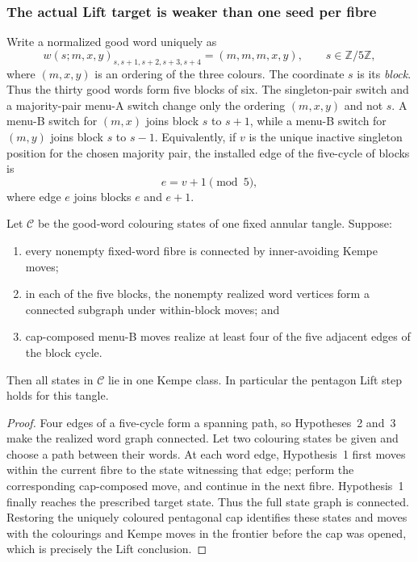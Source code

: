 \subsubsection{The actual Lift target is weaker than one seed per fibre}

Write a normalized good word uniquely as
\[
 w(s;m,x,y)_{s,s+1,s+2,s+3,s+4}=(m,m,m,x,y),
 \qquad s\in\mathbb Z/5\mathbb Z,
\]
where $(m,x,y)$ is an ordering of the three colours.  The coordinate $s$
is its \emph{block}.  Thus the thirty good words form five blocks of six.
The singleton-pair switch and a majority-pair menu-A switch change only the
ordering $(m,x,y)$ and not $s$.  A menu-B switch for $(m,x)$ joins block
$s$ to $s+1$, while a menu-B switch for $(m,y)$ joins block $s$ to $s-1$.
Equivalently, if $v$ is the unique inactive singleton position for the
chosen majority pair, the installed edge of the five-cycle of blocks is
\[
                         e=v+1\pmod 5,
\]
where edge $e$ joins blocks $e$ and $e+1$.

\begin{theorem}
\label{thm:four-block-edge-lift}
Let $\mathcal C$ be the good-word colouring states of one fixed annular
tangle.  Suppose:
\begin{enumerate}
\item every nonempty fixed-word fibre is connected by inner-avoiding Kempe
moves;
\item in each of the five blocks, the nonempty realized word vertices form a
connected subgraph under within-block moves; and
\item cap-composed menu-B moves realize at least four of the five adjacent
edges of the block cycle.
\end{enumerate}
Then all states in $\mathcal C$ lie in one Kempe class.  In particular the
pentagon Lift step holds for this tangle.
\end{theorem}

\begin{proof}
Four edges of a five-cycle form a spanning path, so Hypotheses~2 and~3 make
the realized word graph connected.  Let two colouring states be given and
choose a path between their words.  At each word edge, Hypothesis~1 first
moves within the current fibre to the state witnessing that edge; perform
the corresponding cap-composed move, and continue in the next fibre.
Hypothesis~1 finally reaches the prescribed target state.  Thus the full
state graph is connected.  Restoring the uniquely coloured pentagonal cap
identifies these states and moves with the colourings and Kempe moves in the
frontier before the cap was opened, which is precisely the Lift conclusion.
\end{proof}

